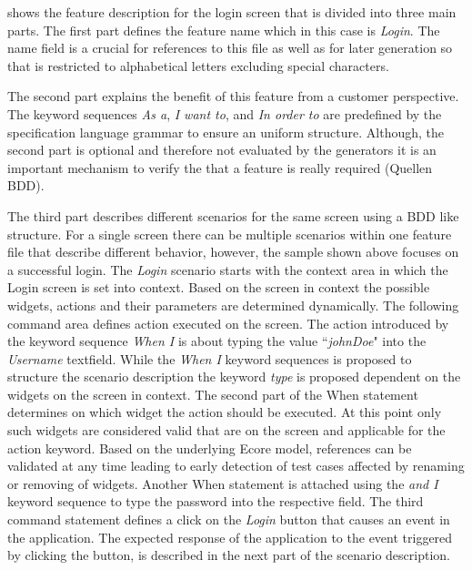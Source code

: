 \documentclass{sig-alternate-05-2015}
\begin{document}
 shows the feature description for the login screen that is divided into three main parts. 
The first part defines the feature name which in this case is \textit{Login}.
The name field is a crucial for references to this file as well as for later generation so that is restricted to alphabetical letters excluding special characters.

The second part explains the benefit of this feature from a customer perspective. 
The keyword sequences \textit{As a}, \textit{I want to}, and \textit{In order to} are predefined by the specification language grammar to ensure an uniform structure.
Although, the second part is optional and therefore not evaluated by the generators it is an important mechanism to verify the that a feature is really required (Quellen BDD).

The third part describes different scenarios for the same screen using a BDD like structure.
For a single screen there can be multiple scenarios within one feature file that describe different behavior, however, the sample shown above focuses on a successful login.
The \textit{Login} scenario starts with the context area in which the Login screen is set into context. 
Based on the screen in context the possible widgets, actions and their parameters are determined dynamically.
The following command area defines action executed on the screen.
The action introduced by the keyword sequence \textit{When I} is about typing the value ``\textit{johnDoe}" into the \textit{Username} textfield. 
While the \textit{When I} keyword sequences is proposed to structure the scenario description the keyword \textit{type} is proposed dependent on the widgets on the screen in context.
The second part of the When statement determines on which widget the action should be executed.
At this point only such widgets are considered valid that are on the screen and applicable for the action keyword.
Based on the underlying Ecore model, references can be validated at any time leading to early detection of test cases affected by renaming or removing of widgets.
Another When statement is attached using the \textit{and I} keyword sequence to type the password into the respective field.
The third command statement defines a click on the \textit{Login} button that causes an event in the application.
The expected response of the application to the event triggered by clicking the button, is described in the next part of the scenario description.
\end{document}
